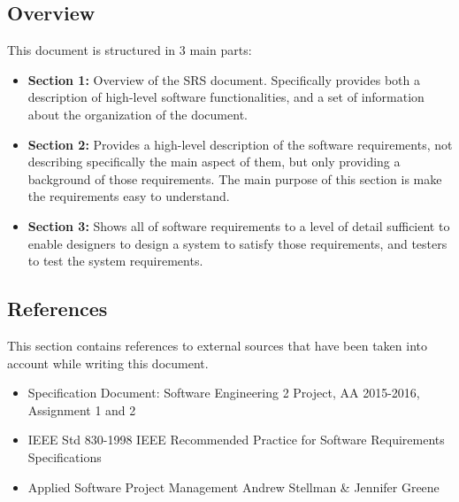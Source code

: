 \subsection{Overview}
This document is structured in 3 main parts:
\begin{itemize}
	\item\textbf{Section 1:} Overview of the SRS document. Specifically provides both a description of high-level software functionalities, and a set of information about the organization of the document.
	\item\textbf{Section 2:} Provides a high-level description of the software requirements, not describing specifically the main aspect of them, but only providing a background of those requirements. The main purpose of this section is make the requirements easy to understand.
	\item\textbf{Section 3:} Shows all of software requirements to a level of detail sufficient to enable designers to design a system to satisfy those requirements, and testers to test the system requirements.
\end{itemize}
\subsection{References}
This section contains references to external sources that have been taken into account while writing this document.
\begin{itemize}
	\item Specification Document: Software Engineering 2 Project, AA 2015-2016, Assignment 1 and 2
	\item IEEE Std 830-1998 IEEE Recommended Practice for Software Requirements Specifications
	\item Applied Software Project Management Andrew Stellman \& Jennifer Greene
\end{itemize}